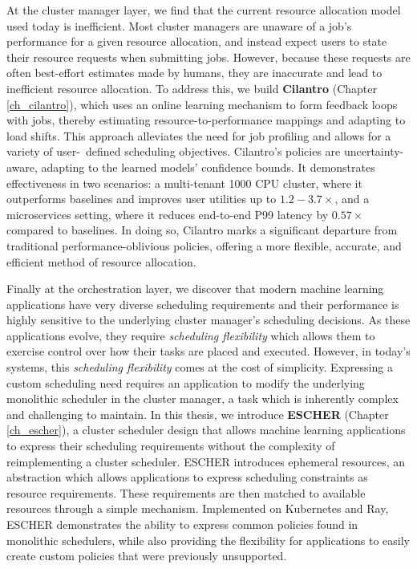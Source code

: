 At the cluster manager layer, we find that the current resource allocation model used today is inefficient. Most cluster managers are unaware of a job's performance for a given resource allocation, and instead expect users to state their resource requests when submitting jobs. However, because these requests are often best-effort estimates made by humans, they are inaccurate and lead to inefficient resource allocation. To address this, we build \textbf{Cilantro} (Chapter \ref{ch_cilantro}), which uses an online learning mechanism to form feedback loops with jobs, thereby estimating resource-to-performance mappings and adapting to load shifts. This approach alleviates the need for job profiling and allows for a variety of user- defined scheduling objectives. Cilantro's policies are uncertainty-aware, adapting to the learned models' confidence bounds. It demonstrates effectiveness in two scenarios: a multi-tenant 1000 CPU cluster, where it outperforms baselines and improves user utilities up to $1.2-3.7\times$, and a microservices setting, where it reduces end-to-end P99 latency by $0.57\times$ compared to baselines. In doing so, Cilantro marks a significant departure from traditional performance-oblivious policies, offering a more flexible, accurate, and efficient method of resource allocation.

Finally at the orchestration layer, we discover that modern machine learning applications have very diverse scheduling requirements and their performance is highly sensitive to the underlying cluster manager's scheduling decisions.  As these applications evolve, they require \textit{scheduling flexibility} which allows them to exercise control over how their tasks are placed and executed. However, in today's systems, this \textit{scheduling flexibility} comes at the cost of simplicity. Expressing a custom scheduling need requires an application to modify the underlying monolithic scheduler in the cluster manager, a task which is inherently complex and challenging to maintain. In this thesis, we introduce \textbf{ESCHER} (Chapter \ref{ch_escher}), a cluster scheduler design that allows machine learning applications to express their scheduling requirements without the complexity of reimplementing a cluster scheduler. ESCHER introduces ephemeral resources, an abstraction which allows applications to express scheduling constraints as resource requirements. These requirements are then matched to available resources through a simple mechanism. Implemented on Kubernetes and Ray, ESCHER demonstrates the ability to express common policies found in monolithic schedulers, while also providing the flexibility for applications to easily create custom policies that were previously unsupported. %


